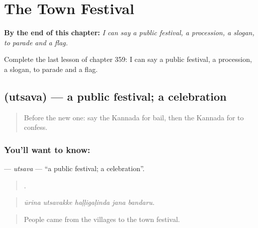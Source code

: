 
\chapter{The Town Festival}
\label{ch:ka-the-town-festival}

\begin{chapteropening}
\textbf{By the end of this chapter:} \emph{I can say a public festival, a procession, a slogan, to parade and a flag.}

Complete the last lesson of chapter 359: I can say a public festival, a procession, a slogan, to parade and a flag.
\end{chapteropening}

\section[\texorpdfstring{\kn{ಉತ್ಸವ} (utsava)}{ಉತ್ಸವ (utsava)}]{ (utsava) — a public festival; a celebration}

\label{lesson:KA-C359-utsava}



\begin{quote}
Before the new one: say the Kannada for bail, then the Kannada for to confess.
\end{quote}

\subsection*{You'll want to know: }
\textbf{} — \emph{utsava} — \textquotedblleft{}a public festival; a celebration\textquotedblright{}.

\begin{quote}
    .
\end{quote}

\begin{quote}
\emph{ūrina utsavakke haḷḷigaḷinda jana bandaru.}
\end{quote}

\begin{quote}
People came from the villages to the town festival.
\end{quote}

